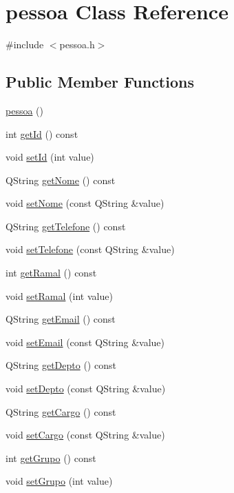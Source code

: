 \hypertarget{classpessoa}{}\section{pessoa Class Reference}
\label{classpessoa}


{\ttfamily \#include $<$pessoa.\+h$>$}

\subsection*{Public Member Functions}
\begin{DoxyCompactItemize}
\item 
\hyperlink{classpessoa_ae2ee70812ff092a18c24ed94eaae260b}{pessoa} ()
\item 
int \hyperlink{classpessoa_a9a20cb67d382a667ad8ed10761b50211}{get\+Id} () const
\item 
void \hyperlink{classpessoa_ab528a41c403719b847f8e43c0893e14c}{set\+Id} (int value)
\item 
Q\+String \hyperlink{classpessoa_a83dd5ee7d276187449bb8f337c4864ba}{get\+Nome} () const
\item 
void \hyperlink{classpessoa_a1212ac1dfede6a2a83adf84be6b9c321}{set\+Nome} (const Q\+String \&value)
\item 
Q\+String \hyperlink{classpessoa_a5e13bd9cf6187d2ceefd4faa9f43cb6c}{get\+Telefone} () const
\item 
void \hyperlink{classpessoa_a6c7b481abf0bc292e5ff28367f5e7512}{set\+Telefone} (const Q\+String \&value)
\item 
int \hyperlink{classpessoa_afe3f63c712664c2ac32f89ed8595d75d}{get\+Ramal} () const
\item 
void \hyperlink{classpessoa_a4e6fa1b22e8824e270fd2aee4c9866e7}{set\+Ramal} (int value)
\item 
Q\+String \hyperlink{classpessoa_a4a12f308282c24e8591a8e8676624695}{get\+Email} () const
\item 
void \hyperlink{classpessoa_a79249a39e2a46cca19acef0476c34bf2}{set\+Email} (const Q\+String \&value)
\item 
Q\+String \hyperlink{classpessoa_a1acfd4c15d0b8bfc1140f6063a1739ae}{get\+Depto} () const
\item 
void \hyperlink{classpessoa_a4a32656512ade652bec82a5c749ad7d1}{set\+Depto} (const Q\+String \&value)
\item 
Q\+String \hyperlink{classpessoa_a07fe59858c0c8ff2d3bb6bc3879de6b3}{get\+Cargo} () const
\item 
void \hyperlink{classpessoa_a1a6ebf59740db53d42fbac357f6219b5}{set\+Cargo} (const Q\+String \&value)
\item 
int \hyperlink{classpessoa_ad1bad474adbfadf472ad857a7c5f181c}{get\+Grupo} () const
\item 
void \hyperlink{classpessoa_abde4772449869bd2c8e5e6d280e4f9f5}{set\+Grupo} (int value)
\end{DoxyCompactItemize}
